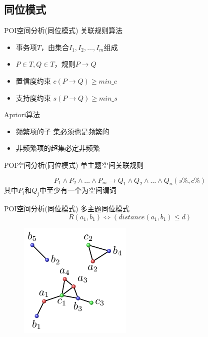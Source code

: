 \subsection{同位模式}

\begin{frame}[c]{POI空间分析(同位模式)}
    \alert{关联规则算法}

    \vspace{1em}
    \begin{itemize}
        \item 事务项$T$，由集合$I_1,I_2,\ldots,I_m$组成
        \item $P \in T, Q \in T$，规则$P \rightarrow Q$
        \item 置信度约束 $c(P \rightarrow Q) \ge min\_c$
        \item 支持度约束 $s(P \rightarrow Q) \ge min\_s$
    \end{itemize}

    \pause
    \vspace{1em}
    \alert{Apriori算法}

    \begin{itemize}
        \item 频繁项的子 集必须也是频繁的
        \item 非频繁项的超集必定非频繁
    \end{itemize}
\end{frame}

\begin{frame}[c]{POI空间分析(同位模式)}
    单主题空间关联规则

    \begin{equation}
        P_1\wedge P_2\wedge \ldots \wedge P_m \rightarrow Q_1\wedge Q_2\wedge \ldots \wedge Q_n(s\%, c\%)
    \end{equation}
    其中$P_i$和$Q_j$中至少有一个为空间谓词
\end{frame}

\begin{frame}[c]{POI空间分析(同位模式)}
    多主题同位模式
    \begin{equation}
        R(a_1,b_1) \Leftrightarrow (distance(a_1,b_1)\le d)
    \end{equation}

    \pause
    \begin{figure}
        \centering
        \includegraphics[scale=1.0]{figures/spatialrelation.pdf}
    \end{figure}
\end{frame}

